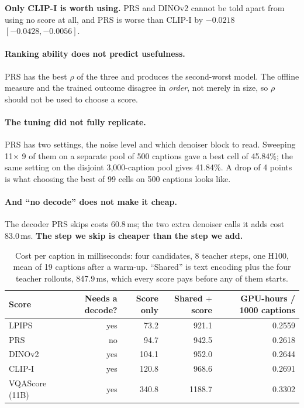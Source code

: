 \documentclass[11pt]{article}
\newcommand{\obs}[1]{\textcolor{obsblue}{#1}}
\begin{document}
\textbf{Only CLIP-I is worth using.} PRS and DINOv2 cannot be told apart from using no score at all,
and PRS is worse than CLIP-I by \obs{$-0.0218$} $[-0.0428,-0.0056]$.

\paragraph{Ranking ability does not predict usefulness.}
PRS has the best $\rho$ of the three and produces the second-worst model. The offline measure and the
trained outcome disagree in \emph{order}, not merely in size, so $\rho$ should not be used to choose
a score.

\paragraph{The tuning did not fully replicate.}
PRS has two settings, the noise level and which denoiser block to read. Sweeping \obs{11}$\times$
\obs{9} of them on a separate pool of \obs{500} captions gave a best cell of \obs{45.84\%}; the same
setting on the disjoint \obs{3{,}000}-caption pool gives \obs{41.84\%}. A drop of \obs{4} points is
what choosing the best of \obs{99} cells on \obs{500} captions looks like.

\paragraph{And ``no decode'' does not make it cheap.}
The decoder PRS skips costs \obs{60.8}\,ms; the two extra denoiser calls it adds cost
\obs{83.0}\,ms. \textbf{The step we skip is cheaper than the step we add.}

\begin{table}[h]
\centering
\caption{Cost per caption in milliseconds: four candidates, \obs{8} teacher steps, one H100, mean of
\obs{19} captions after a warm-up. ``Shared'' is text encoding plus the four teacher rollouts,
\obs{847.9}\,ms, which every score pays before any of them starts.}
\label{tab:cost}
\small
\begin{tabular}{@{}lrrrr@{}}
\toprule
Score & Needs a decode? & Score only & Shared $+$ score & GPU-hours / 1000 captions \\
\midrule
LPIPS & yes & \obs{73.2} & \obs{921.1} & \obs{0.2559} \\
PRS & no & \obs{94.7} & \obs{942.5} & \obs{0.2618} \\
DINOv2 & yes & \obs{104.1} & \obs{952.0} & \obs{0.2644} \\
CLIP-I & yes & \obs{120.8} & \obs{968.6} & \obs{0.2691} \\
VQAScore (11B) & yes & \obs{340.8} & \obs{1188.7} & \obs{0.3302} \\
\bottomrule
\end{tabular}
\end{table}
\end{document}
